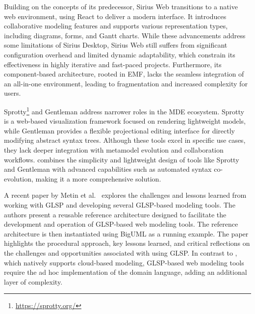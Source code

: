Building on the concepts of its predecessor, Sirius Web \cite{Giraudet2024} transitions to a native web environment, using React to deliver a modern interface. It introduces collaborative modeling features and supports various representation types, including diagrams, forms, and Gantt charts. While these advancements address some limitations of Sirius Desktop, Sirius Web still suffers from significant configuration overhead and limited dynamic adaptability, which constrain its effectiveness in highly iterative and fast-paced projects. Furthermore, its component-based architecture, rooted in EMF, lacks the seamless integration of an all-in-one environment, leading to fragmentation and increased complexity for users. 

Sprotty\footnote{\url{https://sprotty.org/}} and Gentleman \cite{3417990.3421998} address narrower roles in the MDE ecosystem. Sprotty is a web-based visualization framework focused on rendering lightweight models, while Gentleman provides a flexible projectional editing interface for directly modifying abstract syntax trees. Although these tools excel in specific use cases, they lack deeper integration with metamodel evolution and collaboration workflows. \jjodel{} combines the simplicity and lightweight design of tools like Sprotty and Gentleman with advanced capabilities such as automated syntax co-evolution, making it a more comprehensive solution.


A recent paper by Metin et al.~\cite{Metin2025} explores the challenges and lessons learned from working with GLSP and developing several GLSP-based modeling tools. The authors present a reusable reference architecture designed to facilitate the development and operation of GLSP-based web modeling tools. The reference architecture is then instantiated using BigUML as a running example. The paper highlights the procedural approach, key lessons learned, and critical reflections on the challenges and opportunities associated with using GLSP. In contrast to \jjodel{}, which natively supports cloud-based modeling, GLSP-based web modeling tools require the ad hoc implementation of the domain language, adding an additional layer of complexity.

